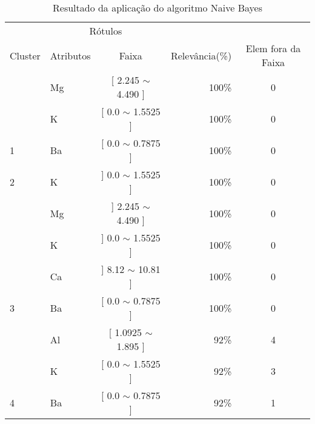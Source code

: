 \begin{table}[!h]
\centering
\caption{Resultado da aplicação do algoritmo Naive Bayes}
\label{tab:rot:glass:nb}
\begin{tabular}{llcrc} 
\hline \hline
 
\multicolumn{1}{c}{\cellcolor[HTML]{FFFFFF}} & \multicolumn{2}{c}{Rótulos}                & \multicolumn{1}{r}{}               & \\ \cline{2-3}
Cluster                                      & Atributos      & \multicolumn{1}{c}{Faixa} & \multicolumn{1}{c}{Relevância(\%)} & Elem fora da Faixa\\ \hline \hline
                                             & Mg    & [ 2.245 $\sim$  4.490     ]       & 100\%                               & 0 \\
                                             & K     & [ 0.0 $\sim$  1.5525      ]       & 100\%                               & 0 \\  
\multirow{-3}{*}{1}                          & Ba    & [ 0.0 $\sim$  0.7875     ]       & 100\%                               & 0 \\  \hline
2                                            & K     & ] 0.0 $\sim$  1.5525 ]           & 100\%                               & 0\\  \hline
                                            & Mg     & ]  2.245 $\sim$  4.490  ]              & 100\%                               & 0\\ 
                                            & K     & ] 0.0 $\sim$  1.5525 ]               & 100\%                               & 0\\  
                                            & Ca     & ] 8.12 $\sim$  10.81 ]       & 100\%                               & 0\\ 
\multirow{-3}{*}{3}                          & Ba    & [ 0.0 $\sim$  0.7875     ]       & 100\%                               & 0 \\  \hline
                                             & Al    & [ 1.0925 $\sim$  1.895 ]       & 92\%                               & 4 \\
                                             & K     & [ 0.0 $\sim$  1.5525      ]       & 92\%                               & 3 \\  
\multirow{-3}{*}{4}                          & Ba    & [ 0.0 $\sim$  0.7875     ]       & 92\%                               & 1 \\  \hline

\end{tabular}
\end{table}
